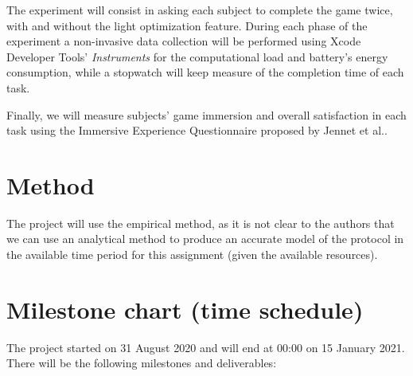 \documentclass[12pt,twoside,english]{article}
\begin{document}
The experiment will consist in asking each subject to complete the game twice, with and without the light optimization feature. During each phase of the experiment a non-invasive data collection will be performed using Xcode Developer Tools' \emph{Instruments} for the computational load and battery's energy consumption, while a stopwatch will keep measure of the completion time of each task.

Finally, we will measure subjects' game immersion and overall satisfaction in each task using the Immersive Experience Questionnaire proposed by Jennet et al.\cite{jennett_measuring_2008}.

\section{Method}
\label{sect:method}

The project will use the empirical method\cite{peter_bock_getting_2001}, as it is not clear to the authors that we can use an analytical method to produce an accurate model of the protocol in the available time period for this assignment (given the available resources).

\section{Milestone chart (time schedule)}
\label{sect:milestones}

The project started on 31 August 2020 and will end at 00:00 on 15 January 2021. There will be the following milestones and deliverables:
\end{document}

